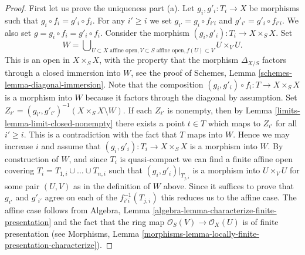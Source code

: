 \begin{proof}
First let us prove the uniqueness part (a). Let $g_i, g'_i : T_i \to X$ be
morphisms such that $g_i \circ f_i = g'_i \circ f_i$. For any $i' \geq i$
we set $g_{i'} = g_i \circ f_{i'i}$ and $g'_{i'} = g'_i \circ f_{i'i}$.
We also set $g = g_i \circ f_i = g'_i \circ f_i$.
Consider the morphism
$(g_i, g'_i) : T_i \to X \times_S X$. Set
$$
W =
\bigcup\nolimits_{U \subset X\text{ affine open},
V \subset S\text{ affine open}, f(U) \subset V}
U \times_V U.
$$
This is an open in $X \times_S X$, with the property that the morphism
$\Delta_{X/S}$ factors through a closed immersion into $W$, see the proof
of Schemes, Lemma \ref{schemes-lemma-diagonal-immersion}.
Note that the composition
$(g_i, g'_i) \circ f_i : T \to X \times_S X$ is a morphism into $W$
because it factors through the diagonal by assumption.
Set $Z_{i'} = (g_{i'}, g'_{i'})^{-1}(X \times_S X \setminus W)$.
If each $Z_{i'}$ is nonempty, then by Lemma \ref{limits-lemma-limit-closed-nonempty}
there exists a point $t \in T$ which maps to $Z_{i'}$ for all
$i' \geq i$. This is a contradiction with the fact that $T$ maps into $W$.
Hence we may increase $i$ and assume that $(g_i, g'_i) : T_i \to X \times_S X$
is a morphism into $W$. By construction of $W$, and since $T_i$ is
quasi-compact we can find a finite affine open covering
$T_i = T_{1, i} \cup \ldots \cup T_{n, i}$ such that
$(g_i, g'_i)|_{T_{j, i}}$ is a morphism into $U \times_V U$ for
some pair $(U, V)$ as in the definition of $W$ above.
Since it suffices to prove that $g_{i'}$ and $g'_{i'}$ agree
on each of the $f_{i'i}^{-1}(T_{j, i})$ this reduces us to the affine case.
The affine case follows from
Algebra, Lemma \ref{algebra-lemma-characterize-finite-presentation}
and the fact that the ring map
$\mathcal{O}_S(V) \to \mathcal{O}_X(U)$ is of finite presentation
(see Morphisms,
Lemma \ref{morphisms-lemma-locally-finite-presentation-characterize}).


\end{proof}
